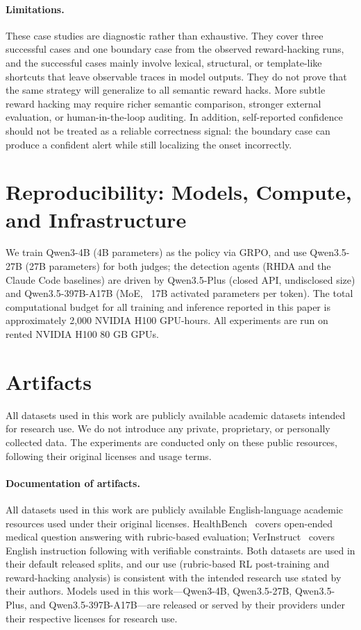 \documentclass{llmxive}
\begin{document}
\paragraph{Limitations.}
These case studies are diagnostic rather than exhaustive. They cover three successful cases and one boundary case from the observed reward-hacking runs, and the successful cases mainly involve lexical, structural, or template-like shortcuts that leave observable traces in model outputs. They do not prove that the same strategy will generalize to all semantic reward hacks. More subtle reward hacking may require richer semantic comparison, stronger external evaluation, or human-in-the-loop auditing. In addition, self-reported confidence should not be treated as a reliable correctness signal: the boundary case can produce a confident alert while still localizing the onset incorrectly.


\section{Reproducibility: Models, Compute, and Infrastructure}
\label{app:reproducibility}
We train Qwen3-4B (4B parameters) as the policy via GRPO, and use Qwen3.5-27B (27B parameters) for both judges; the detection agents (RHDA and the Claude Code baselines) are driven by Qwen3.5-Plus (closed API, undisclosed size) and Qwen3.5-397B-A17B (MoE, ~17B activated parameters per token). The total computational budget for all training and inference reported in this paper is approximately 2,000 NVIDIA H100 GPU-hours. All experiments are run on rented NVIDIA H100 80 GB GPUs.

\section{Artifacts}

All datasets used in this work are publicly available academic datasets intended for research use. We do not introduce any private, proprietary, or personally collected data. The experiments are conducted only on these public resources, following their original licenses and usage terms.

\paragraph{Documentation of artifacts.}
All datasets used in this work are publicly available English-language academic resources used under their original licenses. HealthBench~\citep{aroraHealthBenchEvaluatingLarge2025} covers open-ended medical question answering with rubric-based evaluation; VerInstruct~\citep{pengVerIFVerificationEngineering2025} covers English instruction following with verifiable constraints. Both datasets are used in their default released splits, and our use (rubric-based RL post-training and reward-hacking analysis) is consistent with the intended research use stated by their authors. Models used in this work---Qwen3-4B, Qwen3.5-27B, Qwen3.5-Plus, and Qwen3.5-397B-A17B---are released or served by their providers under their respective licenses for research use.
\end{document}
